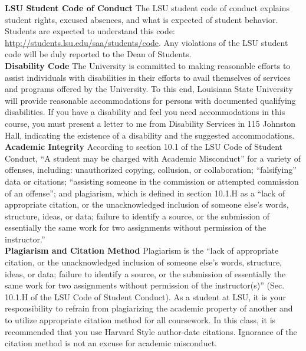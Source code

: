 \documentclass[11pt,article,oneside]{memoir}
\begin{document}
\noindent \textbf{LSU Student Code of Conduct}
The LSU student code of conduct explains student rights, excused absences, and what is expected of student behavior. Students are expected to understand this code:  \url{http://students.lsu.edu/saa/students/code}. Any violations of the LSU student code will be duly reported to the Dean of Students.\\

\noindent \textbf{Disability Code}
The University is committed to making reasonable efforts to assist individuals with disabilities in
their efforts to avail themselves of services and programs offered by the University. To this end,
Louisiana State University will provide reasonable accommodations for persons with
documented qualifying disabilities. If you have a disability and feel you need accommodations in
this course, you must present a letter to me from Disability Services in 115 Johnston Hall,
indicating the existence of a disability and the suggested accommodations.\\

\noindent \textbf{Academic Integrity}
According to section 10.1 of the LSU Code of Student Conduct, ``A student may be charged with Academic Misconduct'' for a variety of offenses, including: unauthorized copying, collusion, or collaboration; ``falsifying'' data or citations; ``assisting someone in the commission or attempted commission of an offense''; and plagiarism, which is defined in section 10.1.H as a ``lack of appropriate citation, or the unacknowledged inclusion of someone else's words, structure, ideas, or data; failure to identify a source, or the submission of essentially the same work for two assignments without permission of the instructor.''\\

\noindent \textbf{Plagiarism and Citation Method}
Plagiarism is the ``lack of appropriate citation, or the unacknowledged inclusion of someone else's words, structure, ideas, or data; failure to identify a source, or the submission of essentially the same work for two assignments without permission of the instructor(s)'' (Sec. 10.1.H of the LSU Code of Student Conduct). As a student at LSU, it is your responsibility to refrain from plagiarizing the academic property of another and to utilize appropriate citation method for all coursework. In this class, it is recommended that you use Harvard Style author-date citations. Ignorance of the citation method is not an excuse for academic misconduct.
\end{document}
